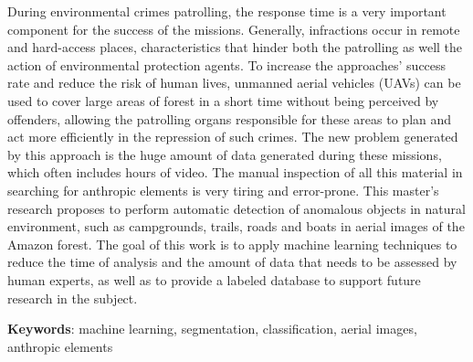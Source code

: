 \begin{resumo}[Abstract]
    During environmental crimes patrolling, the response time is a very important component for the success of the missions. Generally, infractions occur in remote and hard-access places, characteristics that hinder both the patrolling as well the action of environmental protection agents. To increase the approaches' success rate and reduce the risk of human lives, unmanned aerial vehicles (UAVs) can be used to cover large areas of forest in a short time without being perceived by offenders, allowing the patrolling organs responsible for these areas to plan and act more efficiently in the repression of such crimes. The new problem generated by this approach is the huge amount of data generated during these missions, which often includes hours of video. The manual inspection of all this material in searching for anthropic elements is very tiring and error-prone. This master's research proposes to perform automatic detection of anomalous objects in natural environment, such as campgrounds, trails, roads and boats in aerial images of the Amazon forest. The goal of this work is to apply machine learning techniques to reduce the time of analysis and the amount of data that needs to be assessed by human experts, as well as to provide a labeled database to support future research in the subject.
    
    \vspace{\onelineskip}
    \noindent
    \textbf{Keywords}: machine learning, segmentation, classification, aerial images, anthropic elements
\end{resumo}
